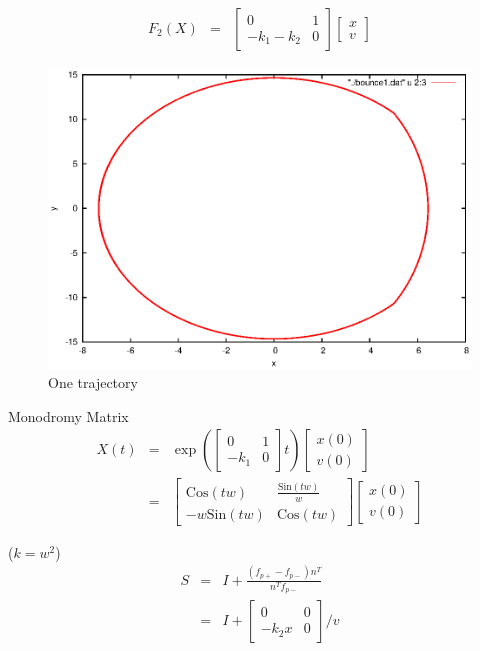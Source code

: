 \documentclass[xcolor=x11names,compress]{beamer}
\renewcommand{\(}{\begin{columns}}
\renewcommand{\)}{\end{columns}}
\newcommand{\<}[1]{\begin{column}{#1}}
\renewcommand{\>}{\end{column}}
\begin{document}
\begin{frame}
\begin{eqnarray}
F_2(X)&=&\begin{bmatrix}
0 & 1\\
-k_1-k_2 & 0
\end{bmatrix}
\begin{bmatrix}
x\\v
\end{bmatrix}
\end{eqnarray}

\begin{figure}
\caption{One trajectory}
\begin{center}
\includegraphics[width=0.6\columnwidth]{trajectory}
\end{center}
\end{figure}

\end{frame}


\begin{frame}{Monodromy Matrix}
\begin{eqnarray*}
X(t)&=&\exp{\left(
\begin{bmatrix}
0 & 1\\
-k_1 & 0
\end{bmatrix}t\right)}
\begin{bmatrix}
x(0)\\v(0)
\end{bmatrix}\\
&=&\begin{bmatrix}
\text {Cos}(t w) & \frac {\text {Sin}(t w)} {w}\\
-w\text {Sin}(t w) &  \text {Cos}(t w)
\end{bmatrix}
\begin{bmatrix}
x(0)\\v(0)
\end{bmatrix}
\end{eqnarray*}

($k=w^2$)\\

\begin{eqnarray}
S&=&I+\frac{(f_{p+}-f_{p-})n^T}{n^Tf_{p-}}\\
&=&I+
\begin{bmatrix}
0 & 0\\
-k_2x & 0 
\end{bmatrix}/v
\end{eqnarray}
\end{frame}
\end{document}
